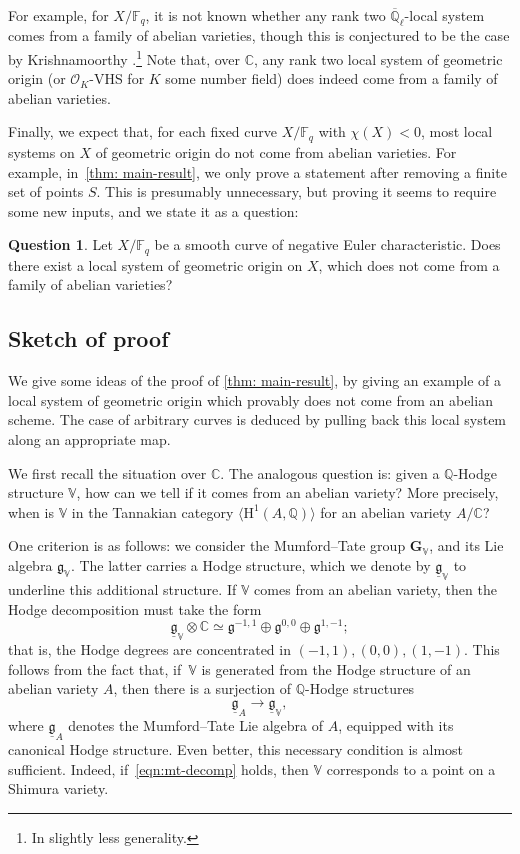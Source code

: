 \documentclass[11pt]{article}
\numberwithin{equation}{subsection}
\theoremstyle{definition}
\newtheorem{question}[thm]{Question}
\newcommand{\Qlbar}{\overline{\mathbb{Q}}_{\ell}}
\newcommand{\Q}{\mathbb Q}
\let\mf\mathfrak
\let\mc\mathcal
\let\mb\mathbb
\let\mbf\mathbf
\begin{document}
For example, for $X/\mb{F}_q$, it is not known whether any rank two $\Qlbar$-local system comes from a family of abelian varieties, though this is conjectured to be the case by Krishnamoorthy \cite[Conj.\,1.2]{Krishnamoorthy-Rank-2-Local-Systems-and-Barsotti-Tate-Groups}.\footnote{In slightly less generality.} Note that, over $\mb{C}$, any rank two local system of geometric origin (or $\mc{O}_K$-VHS for $K$ some number field) does indeed come from a family of abelian varieties.

Finally, we expect that, for each fixed curve $X/\mb{F}_q$ with $\chi(X)<0$, most local systems on $X$ of geometric origin do not come from abelian varieties. For example, in~\cref{thm: main-result}, we only prove a statement after removing a finite set of points $S$. This is presumably unnecessary, but proving it seems to require some new inputs, and we state it as a question:

\begin{question}
Let $X/\mb{F}_q$ be a smooth curve of negative Euler characteristic. Does there exist a local system of geometric origin on $X$, which does not come from a family of abelian varieties?
\end{question}

\subsection{Sketch of proof}
We give some ideas of the proof of \cref{thm: main-result}, by giving an example of a local system of geometric origin which provably does not come from an abelian scheme. The case of arbitrary curves is deduced by pulling back this local system along an appropriate map.

We first recall the situation over $\mb{C}$. The analogous question is: given a $\mb{Q}$-Hodge structure $\mb{V}$, how can we tell if it comes from an abelian variety? More precisely, when is $\mb{V}$ in the Tannakian category $\langle \mathrm{H}^1(A,\Q)\rangle$ for an abelian variety $A/\mb{C}$?

One criterion is as follows: we consider the Mumford--Tate group $\mbf{G}_{\mb{V}}$, and its Lie algebra $\mf{g}_{\mb{V}}$. The latter carries a Hodge structure, which we denote by $\underline{\mf{g}}_{\mb{V}}$ to underline this additional structure. If $\mb{V}$ comes from an abelian variety, then the Hodge decomposition must take the form
\begin{equation}\label{eqn:mt-decomp}
\underline{\mf{g}}_{\mb{V}}\otimes \mb{C}\simeq \mf{g}^{-1,1}\oplus \mf{g}^{0,0}\oplus \mf{g}^{1,-1};
\end{equation}
that is, the Hodge degrees are concentrated in $(-1,1), (0,0), (1,-1)$. This follows from the fact that, if~$\mb{V}$ is generated from the Hodge structure of an abelian variety $A$, then there is a surjection of $\mb{Q}$-Hodge structures
\[
\underline{\mf{g}}_A\rightarrow \underline{\mf{g}}_{\mb{V}},
\]
where $\underline{\mf{g}}_A$ denotes the Mumford--Tate Lie algebra of $A$, equipped with its canonical Hodge structure. Even better, this necessary condition is almost sufficient. Indeed, if~\eqref{eqn:mt-decomp} holds, then $\mb{V}$ corresponds to a point on a Shimura variety.
\end{document}
